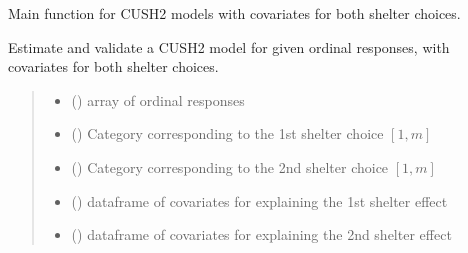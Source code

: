 \documentclass[letterpaper,10pt,english]{sphinxmanual}
\begin{document}
\begin{fulllineitems}
\label{\detokenize{cubmods:cubmods.cush2_xx.mle}}
\pysigstartsignatures
{}
\pysigstopsignatures
\sphinxAtStartPar
Main function for CUSH2 models with covariates for both shelter choices.

\sphinxAtStartPar
Estimate and validate a CUSH2 model for given ordinal responses, with covariates for both shelter choices.
\begin{quote}\begin{description}
\begin{itemize}
\item {} 
\sphinxAtStartPar
{} () \textendash{} array of ordinal responses

\item {} 
\sphinxAtStartPar
{} () \textendash{} Category corresponding to the 1st shelter choice \([1,m]\)

\item {} 
\sphinxAtStartPar
{} () \textendash{} Category corresponding to the 2nd shelter choice \([1,m]\)

\item {} 
\sphinxAtStartPar
{} () \textendash{} dataframe of covariates for explaining the 1st shelter effect

\item {} 
\sphinxAtStartPar
{} () \textendash{} dataframe of covariates for explaining the 2nd shelter effect


\end{itemize}
\end{description}
\end{quote}
\end{fulllineitems}
\end{document}
